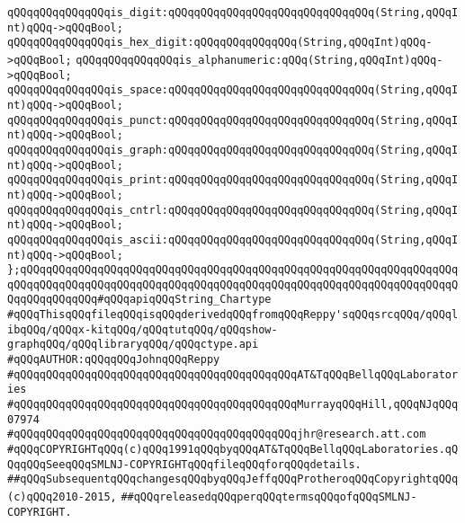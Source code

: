 \verb|qQQqqQQqqQQqqQQqis_digit:qQQqqQQqqQQqqQQqqQQqqQQqqQQqqQQq(String,qQQqInt)qQQq->qQQqBool;|\newline
\verb|qQQqqQQqqQQqqQQqis_hex_digit:qQQqqQQqqQQqqQQq(String,qQQqInt)qQQq->qQQqBool;|\newline
\verb|qQQqqQQqqQQqqQQqis_alphanumeric:qQQq(String,qQQqInt)qQQq->qQQqBool;|\newline
\verb|qQQqqQQqqQQqqQQqis_space:qQQqqQQqqQQqqQQqqQQqqQQqqQQqqQQq(String,qQQqInt)qQQq->qQQqBool;|\newline
\verb|qQQqqQQqqQQqqQQqis_punct:qQQqqQQqqQQqqQQqqQQqqQQqqQQqqQQq(String,qQQqInt)qQQq->qQQqBool;|\newline
\verb|qQQqqQQqqQQqqQQqis_graph:qQQqqQQqqQQqqQQqqQQqqQQqqQQqqQQq(String,qQQqInt)qQQq->qQQqBool;|\newline
\verb|qQQqqQQqqQQqqQQqis_print:qQQqqQQqqQQqqQQqqQQqqQQqqQQqqQQq(String,qQQqInt)qQQq->qQQqBool;|\newline
\verb|qQQqqQQqqQQqqQQqis_cntrl:qQQqqQQqqQQqqQQqqQQqqQQqqQQqqQQq(String,qQQqInt)qQQq->qQQqBool;|\newline
\verb|qQQqqQQqqQQqqQQqis_ascii:qQQqqQQqqQQqqQQqqQQqqQQqqQQqqQQq(String,qQQqInt)qQQq->qQQqBool;|\newline
\newline
\verb|};qQQqqQQqqQQqqQQqqQQqqQQqqQQqqQQqqQQqqQQqqQQqqQQqqQQqqQQqqQQqqQQqqQQqqQQqqQQqqQQqqQQqqQQqqQQqqQQqqQQqqQQqqQQqqQQqqQQqqQQqqQQqqQQqqQQqqQQqqQQqqQQqqQQqqQQq#qQQqapiqQQqString_Chartype|\newline
\newline
\verb|#qQQqThisqQQqfileqQQqisqQQqderivedqQQqfromqQQqReppy'sqQQqsrcqQQq/qQQqlibqQQq/qQQqx-kitqQQq/qQQqtutqQQq/qQQqshow-graphqQQq/qQQqlibraryqQQq/qQQqctype.api|\newline
\newline
\verb|#qQQqAUTHOR:qQQqqQQqJohnqQQqReppy|\newline
\verb|#qQQqqQQqqQQqqQQqqQQqqQQqqQQqqQQqqQQqqQQqqQQqAT&TqQQqBellqQQqLaboratories|\newline
\verb|#qQQqqQQqqQQqqQQqqQQqqQQqqQQqqQQqqQQqqQQqqQQqMurrayqQQqHill,qQQqNJqQQq07974|\newline
\verb|#qQQqqQQqqQQqqQQqqQQqqQQqqQQqqQQqqQQqqQQqqQQqjhr@research.att.com|\newline
\newline
\verb|#qQQqCOPYRIGHTqQQq(c)qQQq1991qQQqbyqQQqAT&TqQQqBellqQQqLaboratories.qQQqqQQqSeeqQQqSMLNJ-COPYRIGHTqQQqfileqQQqforqQQqdetails.|\newline
\verb|##qQQqSubsequentqQQqchangesqQQqbyqQQqJeffqQQqProtheroqQQqCopyrightqQQq(c)qQQq2010-2015,|\newline
\verb|##qQQqreleasedqQQqperqQQqtermsqQQqofqQQqSMLNJ-COPYRIGHT.|\newline

